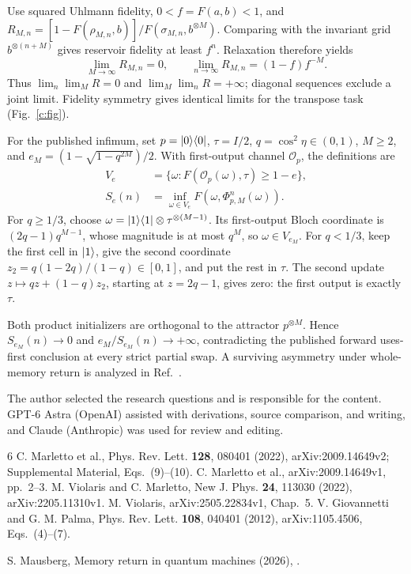 \documentclass[aps,prl,reprint,superscriptaddress,nofootinbib]{revtex4-2}
\begin{document}
Use squared Uhlmann fidelity, $0<f=F(a,b)<1$, and $R_{M,n}=[1-F(\rho_{M,n},b)]/F(\sigma_{M,n},b^{\otimes M})$. Comparing with the invariant grid $b^{\otimes(n+M)}$ gives reservoir fidelity at least $f^n$. Relaxation therefore yields
\begin{equation}
 \lim_{M\to\infty}R_{M,n}=0,\qquad
 \lim_{n\to\infty}R_{M,n}=(1-f)f^{-M}.
 \label{c:limits}
\end{equation}
Thus $\lim_n\lim_M R=0$ and $\lim_M\lim_n R=+\infty$; diagonal sequences exclude a joint limit. Fidelity symmetry gives identical limits for the transpose task (Fig.~\ref{c:fig}).



For the published infimum, set $p=|0\rangle\langle0|$, $\tau=I/2$, $q=\cos^2\eta\in(0,1)$, $M\ge2$, and $e_M=(1-\sqrt{1-q^{2M}})/2$. With first-output channel $\mathcal O_p$, the definitions are
\begin{align}
 V_e&=\{\omega:F(\mathcal O_p(\omega),\tau)\ge1-e\},\nonumber\\
 S_e(n)&=\inf_{\omega\in V_e}F(\omega,\Phi_{p,M}^{n}(\omega)).
\end{align}
For $q\ge1/3$, choose $\omega=|1\rangle\langle1|\otimes\tau^{\otimes(M-1)}$. Its first-output Bloch coordinate is $(2q-1)q^{M-1}$, whose magnitude is at most $q^M$, so $\omega\in V_{e_M}$. For $q<1/3$, keep the first cell in $|1\rangle$, give the second coordinate $z_2=q(1-2q)/(1-q)\in[0,1]$, and put the rest in $\tau$. The second update $z\mapsto qz+(1-q)z_2$, starting at $z=2q-1$, gives zero: the first output is exactly $\tau$.

Both product initializers are orthogonal to the attractor $p^{\otimes M}$. Hence $S_{e_M}(n)\to0$ and $e_M/S_{e_M}(n)\to+\infty$, contradicting the published forward uses-first conclusion at every strict partial swap. A surviving asymmetry under whole-memory return is analyzed in Ref.~\cite{companion}.

\begin{acknowledgments}
The author selected the research questions and is responsible for the content. GPT-6 Astra (OpenAI) assisted with derivations, source comparison, and writing, and Claude (Anthropic) was used for review and editing.
\end{acknowledgments}

\begin{thebibliography}{6}
 C. Marletto et al., Phys. Rev. Lett. \textbf{128}, 080401 (2022), arXiv:2009.14649v2; Supplemental Material, Eqs.~(9)--(10).
 C. Marletto et al., arXiv:2009.14649v1, pp.~2--3.
 M. Violaris and C. Marletto, New J. Phys. \textbf{24}, 113030 (2022), arXiv:2205.11310v1.
 M. Violaris, arXiv:2505.22834v1, Chap.~5.
 V. Giovannetti and G. M. Palma, Phys. Rev. Lett. \textbf{108}, 040401 (2012), arXiv:1105.4506, Eqs.~(4)--(7).
 {\raggedright S. Mausberg, Memory return in quantum machines (2026), \repolink{}.\par}
\end{thebibliography}
\end{document}
